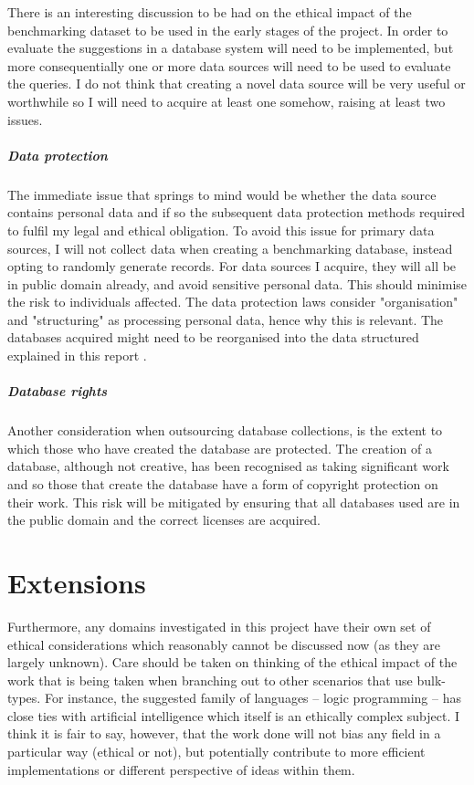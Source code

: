 There is an interesting discussion to be had on the ethical impact of the benchmarking dataset to be used in the early stages of the project. In order to evaluate the suggestions in \cite{RelationalAlgebraByWayOfAdjunctions} a database system will need to be implemented, but more consequentially one or more data sources will need to be used to evaluate the queries. I do not think that creating a novel data source will be very useful or worthwhile so I will need to acquire at least one somehow, raising at least two issues.
\subparagraph*{Data protection} The immediate issue that springs to mind would be whether the data source contains personal data and if so the subsequent data protection methods required to fulfil my legal and ethical obligation. To avoid this issue for primary data sources, I will not collect data when creating a benchmarking database, instead opting to randomly generate records. For data sources I acquire, they will all be in public domain already, and avoid sensitive personal data. This should minimise the risk to individuals affected. The data protection laws consider "organisation" and "structuring" as processing personal data, hence why this is relevant. The databases acquired might need to be reorganised into the data structured explained in this report .  
\subparagraph*{Database rights} Another consideration when outsourcing database collections, is the extent to which those who have created the database are protected. The creation of a database, although not creative, has been recognised as taking significant work and so those that create the database have a form of copyright protection on their work.  This risk will be mitigated by ensuring that all databases used are in the public domain and the correct licenses are acquired.


\section{Extensions}
Furthermore, any domains investigated in this project have their own set of ethical considerations which reasonably cannot be discussed now (as they are largely unknown). Care should be taken on thinking of the ethical impact of the work that is being taken when branching out to other scenarios that use bulk-types. For instance, the suggested family of languages -- logic programming -- has close ties with artificial intelligence which itself is an ethically complex subject.  I think it is fair to say, however, that the work done will not bias any field in a particular way (ethical or not), but potentially contribute to more efficient implementations or different perspective of ideas within them.